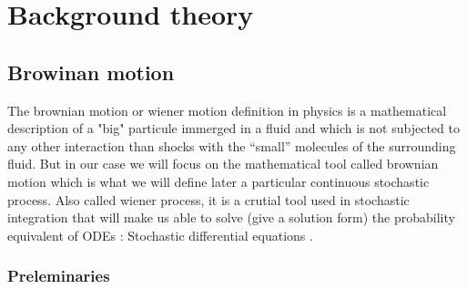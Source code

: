 \chapter{Background theory}
\section{Browinan motion}

The brownian motion or wiener motion definition in physics is a mathematical description of a "big" particule immerged in a fluid and which is not subjected to any other interaction than shocks with the “small” molecules of the surrounding fluid. But in our case we will focus on the mathematical tool called brownian motion which is what we will define later a particular continuous stochastic process. Also called wiener process, it is a crutial tool used in stochastic integration that will make us able to solve (give a solution form) the probability equivalent of ODEs : Stochastic differential equations .

\subsection{Preleminaries}


